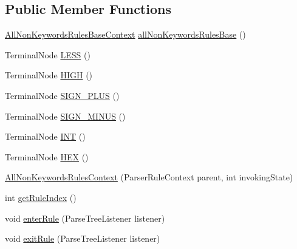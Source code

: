 \subsection*{Public Member Functions}
\begin{DoxyCompactItemize}
\item 
\hyperlink{classgov_1_1nasa_1_1jpf_1_1inspector_1_1client_1_1parser_1_1_console_grammar_parser_1_1_all_non_keywords_rules_base_context}{All\+Non\+Keywords\+Rules\+Base\+Context} \hyperlink{classgov_1_1nasa_1_1jpf_1_1inspector_1_1client_1_1parser_1_1_console_grammar_parser_1_1_all_non_keywords_rules_context_a8308b6ed2aa7bdafb0f79c7cabbdb107}{all\+Non\+Keywords\+Rules\+Base} ()
\item 
Terminal\+Node \hyperlink{classgov_1_1nasa_1_1jpf_1_1inspector_1_1client_1_1parser_1_1_console_grammar_parser_1_1_all_non_keywords_rules_context_a306370257dd21dbff2d3d3e8538f65b2}{L\+E\+SS} ()
\item 
Terminal\+Node \hyperlink{classgov_1_1nasa_1_1jpf_1_1inspector_1_1client_1_1parser_1_1_console_grammar_parser_1_1_all_non_keywords_rules_context_a53732480fc295c480517ecc531355806}{H\+I\+GH} ()
\item 
Terminal\+Node \hyperlink{classgov_1_1nasa_1_1jpf_1_1inspector_1_1client_1_1parser_1_1_console_grammar_parser_1_1_all_non_keywords_rules_context_a77e386a7cf24335cda9134f3f0b6e0a5}{S\+I\+G\+N\+\_\+\+P\+L\+US} ()
\item 
Terminal\+Node \hyperlink{classgov_1_1nasa_1_1jpf_1_1inspector_1_1client_1_1parser_1_1_console_grammar_parser_1_1_all_non_keywords_rules_context_a27dd86b58c5a9d3b566bebdaa8d63a77}{S\+I\+G\+N\+\_\+\+M\+I\+N\+US} ()
\item 
Terminal\+Node \hyperlink{classgov_1_1nasa_1_1jpf_1_1inspector_1_1client_1_1parser_1_1_console_grammar_parser_1_1_all_non_keywords_rules_context_aabe121374c1c134d838f2aa4b42fe97a}{I\+NT} ()
\item 
Terminal\+Node \hyperlink{classgov_1_1nasa_1_1jpf_1_1inspector_1_1client_1_1parser_1_1_console_grammar_parser_1_1_all_non_keywords_rules_context_aafc95a4093dc7e37a4b6cbb28841e9aa}{H\+EX} ()
\item 
\hyperlink{classgov_1_1nasa_1_1jpf_1_1inspector_1_1client_1_1parser_1_1_console_grammar_parser_1_1_all_non_keywords_rules_context_a28cf6f6b9d1f63c79e3494c7ebcfaf9f}{All\+Non\+Keywords\+Rules\+Context} (Parser\+Rule\+Context parent, int invoking\+State)
\item 
int \hyperlink{classgov_1_1nasa_1_1jpf_1_1inspector_1_1client_1_1parser_1_1_console_grammar_parser_1_1_all_non_keywords_rules_context_a63f6b5d64f0413da1335da7ec39d4667}{get\+Rule\+Index} ()
\item 
void \hyperlink{classgov_1_1nasa_1_1jpf_1_1inspector_1_1client_1_1parser_1_1_console_grammar_parser_1_1_all_non_keywords_rules_context_a18c7f681043e3bd36347229b7ac128a6}{enter\+Rule} (Parse\+Tree\+Listener listener)
\item 
void \hyperlink{classgov_1_1nasa_1_1jpf_1_1inspector_1_1client_1_1parser_1_1_console_grammar_parser_1_1_all_non_keywords_rules_context_a267109cbdb87ed5ceba5f3c1e95e38cc}{exit\+Rule} (Parse\+Tree\+Listener listener)
\end{DoxyCompactItemize}


